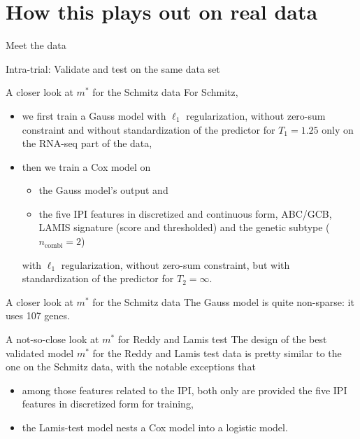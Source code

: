 \documentclass[10pt, aspectratio=169]{beamer}
\begin{document}
\section{How this plays out on real data}

\begin{frame}{Meet the data}
  

\end{frame}

\begin{frame}{Intra-trial: Validate and test on the same data set}
  
\end{frame}

\begin{frame}{A closer look at $m^*$ for the Schmitz data}
  For Schmitz,
  \begin{itemize}
    \item we first train a Gauss model with $\ell_1$ regularization, without 
      zero-sum constraint and without standardization of the predictor for 
      $T_1 = 1.25$ only on the RNA-seq part of the data, 
    \pause
    \item then we train a Cox model on 
      \begin{itemize} 
        \item the Gauss model's output and 
        \item the five IPI features in discretized and continuous form, ABC/GCB, LAMIS signature 
          (score and thresholded) and the genetic subtype ($n_{\text{combi}} = 2$)
      \end{itemize}
      with $\ell_1$ regularization, without zero-sum constraint, but with 
      standardization of the predictor for $T_2 = \infty$.
  \end{itemize}
\end{frame}

\begin{frame}{A closer look at $m^*$ for the Schmitz data}
  The Gauss model is quite non-sparse: it uses 107 genes.

  
\end{frame}

\begin{frame}{A not-so-close look at $m^*$ for Reddy and Lamis test}
  The design of the best validated model $m^*$ for the Reddy and Lamis test 
  data is pretty similar to the one on the Schmitz data, with the notable 
  exceptions that 

  \begin{itemize}
    \item among those features related to the IPI, both only are provided the five IPI 
      features in discretized form for training,
    \item the Lamis-test model nests a Cox model into a logistic model.
  \end{itemize}
\end{frame}
\end{document}
